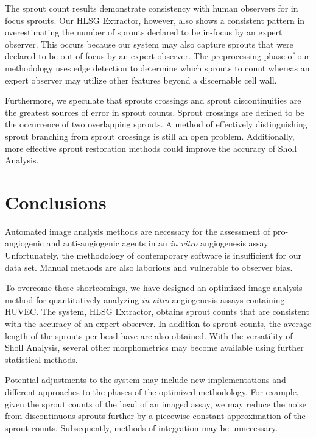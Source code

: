 \documentclass{sig-alternate}
\newcommand{\invitro}{\emph{in vitro} }
\begin{document}
	The sprout count results demonstrate consistency with human observers
	for in focus sprouts. Our HLSG Extractor, however, also shows a
	consistent pattern in overestimating the number of sprouts
	declared to be in-focus by an expert observer. This occurs because
	our system may also capture sprouts that were declared to be
	out-of-focus by an expert observer. The preprocessing phase of our
	methodology uses edge detection to determine which sprouts to
	count whereas an expert observer may utilize other features beyond
	a discernable cell wall.

	Furthermore, we speculate that sprouts crossings and sprout
	discontinuities are the greatest sources of error in sprout counts.
	Sprout crossings are defined to be the occurrence of two overlapping
	sprouts. A method of effectively distinguishing sprout branching from
	sprout crossings is still an open problem. Additionally, more
	effective sprout restoration methods could improve the accuracy of
	Sholl Analysis.

\section{Conclusions} %
\label{sec:Conclusions}
	Automated image analysis methods are necessary for the assessment of
	pro-angiogenic and anti-angiogenic agents in an \invitro angiogenesis
	assay. Unfortunately, the methodology of contemporary software is
	insufficient for our data set. Manual methods are also laborious and
	vulnerable to observer bias.

	To overcome these shortcomings, we have designed an optimized image
	analysis method for quantitatively analyzing \invitro angiogenesis
	assays containing HUVEC. The system, HLSG Extractor, obtains sprout
	counts that are consistent with the accuracy of an expert observer. In
	addition to sprout counts, the average length of the sprouts per bead
	have are also obtained. With the versatility of Sholl Analysis,
	several other morphometrics may become available using further
	statistical methods.

	Potential adjustments to the system may include new implementations
	and different approaches to the phases of the optimized methodology.
	For example, given the sprout counts of the bead of an imaged assay,
	we may reduce the noise from discontinuous sprouts further by a
	piecewise constant approximation of the sprout counts. Subsequently,
	methods of integration may be unnecessary. 
\end{document}
